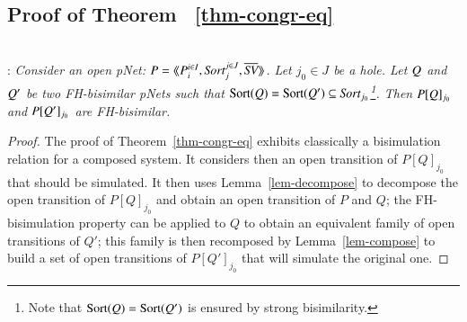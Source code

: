 \documentclass{elsarticle}
\begin{document}
 \subsection{Proof of Theorem ~\ref{thm-congr-eq}}~\\
:
\textit{	Consider an open pNet:
	$\pNet = \mylangle \pNet_i^{i\in I}, \Sort_j^{j\in J}, 
	\set{\symb{SV}}\myrangle$.
	Let $j_0\in J$ be a hole. Let $Q$ and $Q'$ be two FH-bisimilar pNets such that 
	$\Sortop(\pNetQ)=\Sortop(\pNetQ')\subseteq\Sort_{j_0}$\footnote{Note that $\operatorname{Sort}(Q)=\operatorname{Sort}(Q')$ is 
	ensured by 
	strong bisimilarity.}. Then 
	$P[Q]_{j_0}$ and 
	$P[Q']_{j_0}$ are FH-bisimilar.
}
\medskip
\begin{proof}
 The proof of Theorem~\ref{thm-congr-eq} exhibits classically a bisimulation relation for 
 a 
 composed system.  It considers then an open transition of $P[Q]_{j_0}$ that should be 
 simulated. It then uses  Lemma~\ref{lem-decompose} to decompose the open transition 
 of $P[Q]_{j_0}$ and obtain an open transition of $P$ and $Q$; the FH-bisimulation 
 property can 
 be applied  to $Q$ to obtain an equivalent family of open transitions of $Q'$; this 
 family is 
 then recomposed by Lemma~\ref{lem-compose} to build a set of open transitions of 
 $P[Q']_{j_0}$ 
 that will simulate the original one.
 


\end{proof}
\end{document}
